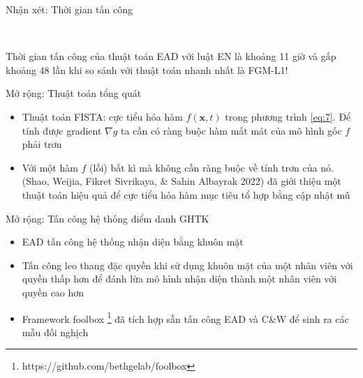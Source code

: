 \begin{frame}{Nhận xét: Thời gian tấn công}
    \begin{table}
         \\
        \caption[Thời gian tính toán]{Thời gian tấn công của các thuật toán trên tập CIFAR10}
        \label{tab:tab_4}
    \end{table}	
    Thời gian tấn công của thuật toán EAD với luật EN là khoảng 11 giờ và gấp khoảng 48 lần khi so sánh với thuật toán nhanh nhất là FGM-L1!
\end{frame}

\begin{frame}{Mở rộng: Thuật toán tổng quát}
    \begin{itemize}
        \item Thuật toán FISTA: cực tiểu hóa hàm $f(\mathbf{x}, t)$ trong phương trình \ref{eq:7}. Để tính được gradient $\nabla g$ ta cần có ràng buộc hàm mất mát của mô hình gốc $f$ phải trơn
        \item Với một hàm $f$ (lồi) bất kì mà không cần ràng buộc về tính trơn của nó. (Shao, Weijia, Fikret Sivrikaya, \& Sahin Albayrak 2022) đã giới thiệu một thuật toán hiệu quả để cực tiểu hóa hàm mục tiêu tổ hợp bằng cập nhật mũ
    \end{itemize}
\end{frame}

\begin{frame}{Mở rộng: Tấn công hệ thống điểm danh GHTK}
    \begin{itemize}
        \item EAD tấn công hệ thống nhận diện bằng khuôn mặt
        \item Tấn công leo thang đặc quyền khi sử dụng khuôn mặt của một nhân viên với quyền thấp hơn để đánh lừa mô hình nhận diện thành một nhân viên với quyền cao hơn
        \item Framework foolbox \footnote{https://github.com/bethgelab/foolbox} đã tích hợp sẵn tấn công EAD và C\&W để sinh ra các mẫu đối nghịch
    \end{itemize}
\end{frame}
